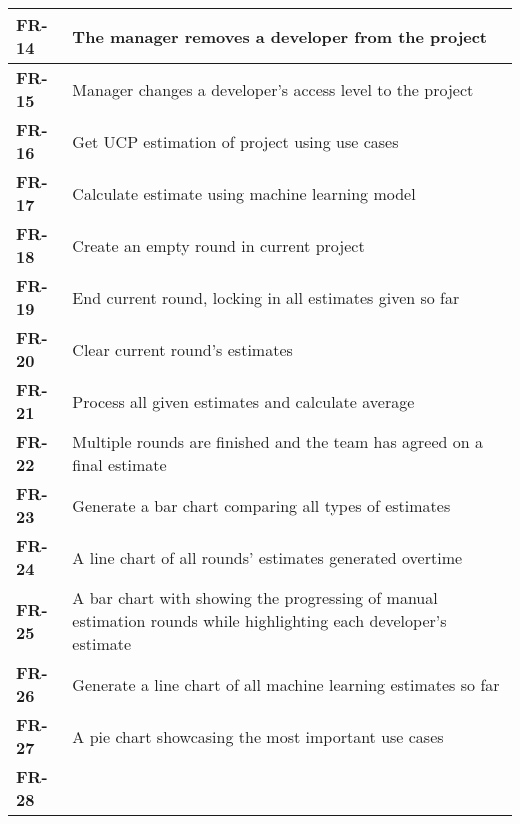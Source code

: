 \begin{center}
\begin{tabularx}{\textwidth}{|l|X|}
        \textbf{FR-14} & The manager removes a developer from the project \\
        \hline
    

        \textbf{FR-15} & Manager changes a developer's access level to the project \\
        \hline
    

        \textbf{FR-16} & Get UCP estimation of project using use cases \\
        \hline
    

        \textbf{FR-17} & Calculate estimate using machine learning model \\
        \hline
    

        \textbf{FR-18} & Create an empty round in current project \\
        \hline
    

        \textbf{FR-19} & End current round, locking in all estimates given so far \\
        \hline
    

        \textbf{FR-20} & Clear current round's estimates \\
        \hline
    

        \textbf{FR-21} & Process all given estimates and calculate average \\
        \hline
    

        \textbf{FR-22} & Multiple rounds are finished and the team has agreed on a final estimate \\
        \hline
    

        \textbf{FR-23} & Generate a bar chart comparing all types of estimates \\
        \hline
    

        \textbf{FR-24} & A line chart of all rounds' estimates generated overtime \\
        \hline
    

        \textbf{FR-25} & A bar chart with showing the progressing of manual estimation rounds while highlighting each developer's estimate \\
        \hline
    

        \textbf{FR-26} & Generate a line chart of all machine learning estimates so far \\
        \hline
    

        \textbf{FR-27} & A pie chart showcasing the most important use cases \\
        \hline
    

        \textbf{FR-28} &  \\
        \hline
    

    \end{tabularx}
    \end{center}

